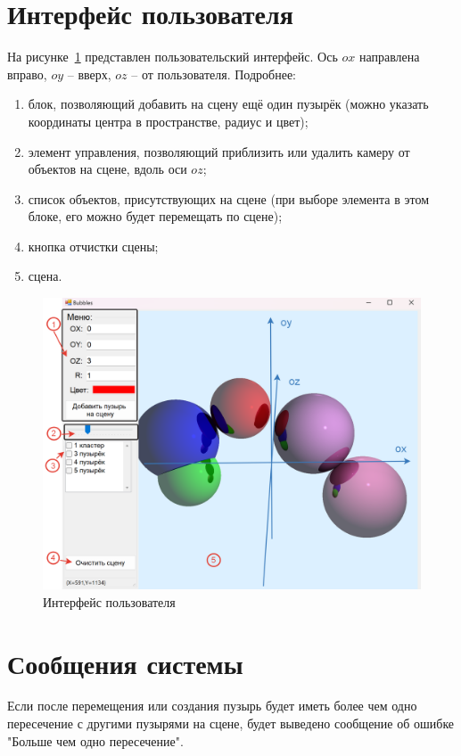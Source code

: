 \section{Интерфейс пользователя}
На рисунке~\ref{fig:interface} представлен пользовательский интерфейс. Ось $ox$ направлена вправо, $oy$ -- вверх, $oz$ -- от пользователя. Подробнее:
\begin{enumerate}[label={\arabic*)}]
	\item блок, позволяющий добавить на сцену ещё один пузырёк (можно указать координаты центра в пространстве, радиус и цвет);
	\item элемент управления, позволяющий приблизить или удалить камеру от объектов на сцене, вдоль оси $oz$;
	\item список объектов, присутствующих на сцене (при выборе элемента в этом блоке, его можно будет перемещать по сцене);
	\item кнопка отчистки сцены;
	\item сцена.  
	
\end{enumerate}
\begin{figure}[h]
	\centering
	\includegraphics[width=1\linewidth]{pictures/interface.png}
	\caption{Интерфейс пользователя}
	\label{fig:interface}
\end{figure}

\section{Сообщения системы}

Если после перемещения или создания пузырь будет иметь более чем одно пересечение с другими пузырями на сцене, будет выведено сообщение об ошибке "Больше чем одно пересечение".

